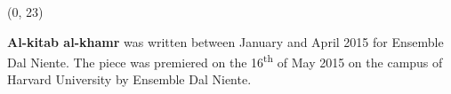 \documentclass[10pt]{article}
\begin{document}
%
%
%

\begin{textblock}{23}(0, 23)

\textbf{Al-kitab al-khamr} was written between January and April 2015 for Ensemble Dal Niente.
The piece was premiered on the 16\textsuperscript{th} of May 2015 on the
campus of Harvard University by Ensemble Dal Niente.

\end{textblock}
\end{document}
